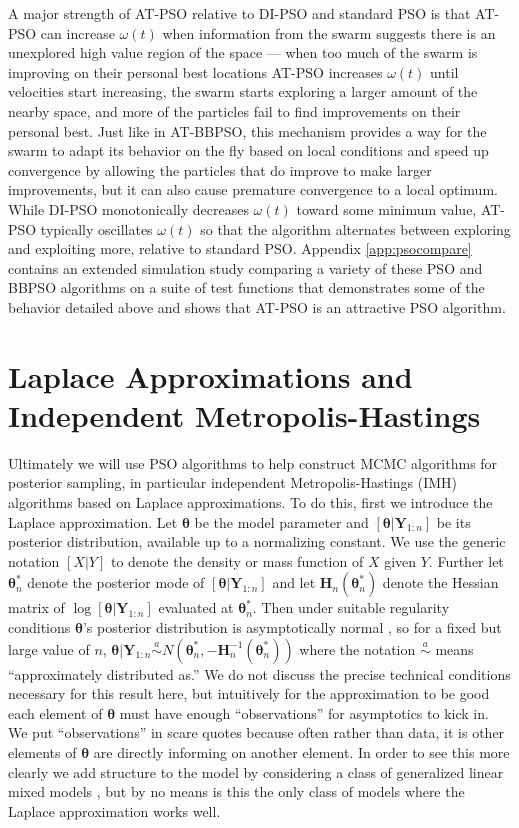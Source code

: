 \documentclass[12pt]{article}
\begin{document}
A major strength of AT-PSO relative to DI-PSO and standard PSO is that AT-PSO can increase $\omega(t)$ when information from the swarm suggests there is an unexplored high value region of the space --- when too much of the swarm is improving on their personal best locations AT-PSO increases $\omega(t)$ until velocities start increasing, the swarm starts exploring a larger amount of the nearby space, and more of the particles fail to find improvements on their personal best. Just like in AT-BBPSO, this mechanism provides a way for the swarm to adapt its behavior on the fly based on local conditions and speed up convergence by allowing the particles that do improve to make larger improvements, but it can also cause premature convergence to a local optimum. While DI-PSO monotonically decreases $\omega(t)$ toward some minimum value, AT-PSO typically oscillates $\omega(t)$ so that the algorithm alternates between exploring and exploiting more, relative to standard PSO. Appendix \ref{app:psocompare} contains an extended simulation study comparing a variety of these PSO and BBPSO algorithms on a suite of test functions that demonstrates some of the behavior detailed above and shows that AT-PSO is an attractive PSO algorithm. 

\section{Laplace Approximations and Independent Metropolis-Hastings}\label{sec:laplace}
Ultimately we will use PSO algorithms to help construct MCMC algorithms for posterior sampling, in particular independent Metropolis-Hastings (IMH) algorithms based on Laplace approximations. To do this, first we introduce the Laplace approximation. Let $\bm{\theta}$ be the model parameter and $[\bm{\theta}|\bm{Y}_{1:n}]$ be its posterior distribution, available up to a normalizing constant. We use the generic notation $[X|Y]$ to denote the density or mass function of $X$ given $Y$.  Further let $\bm{\theta}^*_n$ denote the posterior mode of $[\bm{\theta}|\bm{Y}_{1:n}]$ and let $\bm{H}_n(\bm{\theta}^*_n)$ denote the Hessian matrix of $\log [\bm{\theta}|\bm{Y}_{1:n}]$ evaluated at $\bm{\theta}_n^*$. Then under suitable regularity conditions $\bm{\theta}$'s posterior distribution is asymptotically normal \citep[Sections~7.4.2~and~7.4.3]{schervish1997theory}, so for a fixed but large value of $n$, $\bm{\theta}|\bm{Y}_{1:n} \stackrel{a}{\sim} N(\bm{\theta}_n^*, -\bm{H}_n^{-1}(\bm{\theta}^*_n))$ where the notation $\stackrel{a}{\sim}$ means ``approximately distributed as.'' We do not discuss the precise technical conditions necessary for this result here, but intuitively for the approximation to be good each element of $\bm{\theta}$ must have enough ``observations'' for asymptotics to kick in. We put ``observations'' in scare quotes because often rather than data, it is other elements of $\bm{\theta}$ are directly informing on another element. In order to see this more clearly we add structure to the model by considering a class of generalized linear mixed models \citep[GLMMs;][]{stroup2012generalized}, but by no means is this the only class of models where the Laplace approximation works well.
\end{document}
